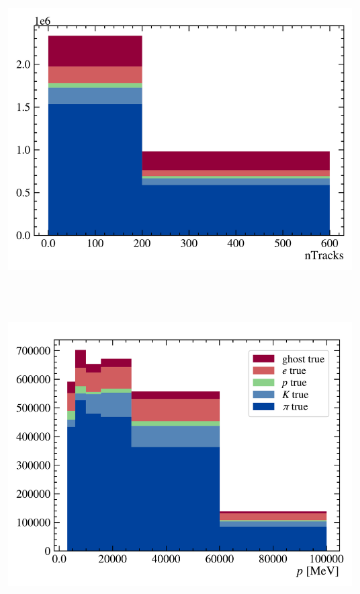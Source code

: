 \begin{figure}[!htb]
    \begin{subfigure}[b]{0.32\textwidth}
        \centering
        \includegraphics[width=\textwidth]{figs-fit-fit-templates/data-driven-plots/misid/D0-tag_ntracks.pdf}
    \end{subfigure}
    \\
    \begin{subfigure}[b]{0.32\textwidth}
        \centering
        \includegraphics[width=\textwidth]{figs-fit-fit-templates/data-driven-plots/misid/D0-true_p.pdf}
    \end{subfigure}
    \hfill
    \begin{subfigure}[b]{0.32\textwidth}
        \centering

\end{subfigure}
\end{figure}
